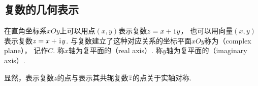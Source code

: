 \subsection{复数的几何表示}
\begin{definition}%
在直角坐标系\(xOy\)上可以用点\((x,y)\)表示复数\(z = x + \kern1pt\mathrm{i}\kern1pt y\)，
也可以用向量\((x,y)\)表示复数\(z = x + \kern1pt\mathrm{i}\kern1pt y\).
与复数建立了这种对应关系的坐标平面\(xOy\)称为（complex plane），
记作\(C\).
称\(x\)轴为复平面的（real axis）.
称\(y\)轴为复平面的（imaginary axis）.

显然，表示复数\(z\)的点与表示其共轭复数\(\overline{z}\)的点关于实轴对称.
\end{definition}

